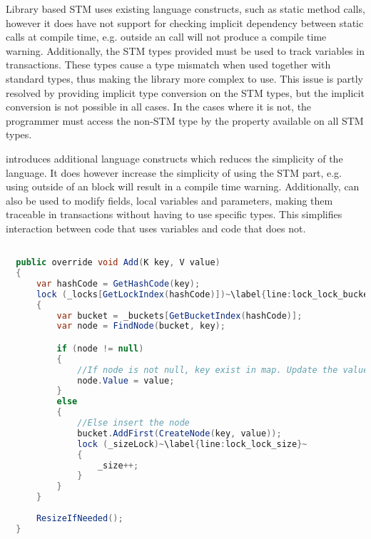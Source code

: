 Library based \ac{STM} uses existing language constructs, such as static method calls, however it does have not support for checking implicit dependency between static calls at compile time, e.g.  outside an  call will not produce a compile time warning. Additionally, the \ac{STM} types provided must be used to track variables in transactions. These types cause a type mismatch when used together with standard types, thus making the library more complex to use. This issue is partly resolved by providing implicit type conversion on the \ac{STM} types, but the implicit conversion is not possible in all cases. In the cases where it is not, the programmer must access the non-\ac{STM} type by the  property available on all \ac{STM} types. 

\stmnamesp introduces additional language constructs which reduces the simplicity of the language. It does however increase the simplicity of using the \ac{STM} part, e.g. using  outside of an  block will result in a compile time warning. Additionally,  can also be used to modify fields, local variables and parameters, making them traceable in transactions without having to use specific types. This simplifies interaction between code that uses  variables and code that does not. 

\begin{lstlisting}[float,label=lst:lock_add_hashmap,
  caption={ConcurrentHashMap \bscode{Add} Method - Locking},
  language=Java,  
  showspaces=false,
  showtabs=false,
  breaklines=true,
  showstringspaces=false,
  breakatwhitespace=true,
  escapechar=~,
  commentstyle=\color{greencomments},
  keywordstyle=\color{bluekeywords},
  stringstyle=\color{redstrings},
  morekeywords={atomic, retry, orelse, var, get, set, ref, out}]  % Start your code-block

  public override void Add(K key, V value)
  {
      var hashCode = GetHashCode(key);
      lock (_locks[GetLockIndex(hashCode)])~\label{line:lock_lock_bucket}~
      {
          var bucket = _buckets[GetBucketIndex(hashCode)];
          var node = FindNode(bucket, key);

          if (node != null)
          {
              //If node is not null, key exist in map. Update the value
              node.Value = value;
          }
          else
          {
              //Else insert the node
              bucket.AddFirst(CreateNode(key, value));
              lock (_sizeLock)~\label{line:lock_lock_size}~
              {
                  _size++;
              }
          }
      }
      
      ResizeIfNeeded();
  }
\end{lstlisting}

